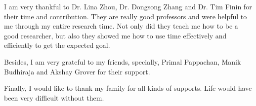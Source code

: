 \pagestyle{plain}

I am very thankful to Dr. Lina Zhou, Dr. Dongsong Zhang and Dr. Tim Finin for their time and contribution. They are really good professors and were helpful to me through my entire research time. Not only did they teach me how to be a good researcher, but also they showed me how to use time effectively and efficiently to get the expected goal. 

Besides, I am very grateful to my friends, specially, Primal Pappachan, Manik Budhiraja and Akshay Grover for their support. 

Finally, I would like to thank my family for all kinds of supports. Life would have been very difficult without them.  